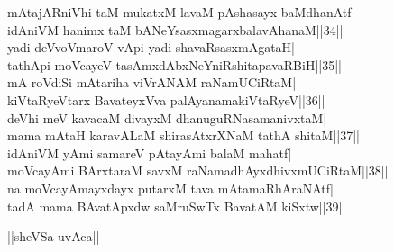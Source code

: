 \documentclass{article}
\begin{document}
mAtajARniVhi taM mukatxM lavaM pAshasayx baMdhanAtf|\\
idAniVM hanimx taM bANeYsasxmagarxbalavAhanaM||34||\\
yadi deVvoVmaroV vApi yadi shavaRsasxmAgataH|\\
tathApi moVcayeV tasAmxdAbxNeYniRshitapavaRBiH||35||\\
mA roVdiSi mAtariha viVrANAM raNamUCiRtaM|\\
kiVtaRyeVtarx BavateyxVva palAyanamakiVtaRyeV||36||\\
deVhi meV kavacaM divayxM dhanuguRNasamanivxtaM|\\
mama mAtaH karavALaM shirasAtxrXNaM tathA shitaM||37||\\
idAniVM yAmi samareV pAtayAmi balaM  mahatf|\\
moVcayAmi BArxtaraM savxM raNamadhAyxdhivxmUCiRtaM||38||\\
na moVcayAmayxdayx putarxM tava mAtamaRhAraNAtf|\\
tadA mama BAvatApxdw saMruSwTx BavatAM kiSxtw||39||\\

\begin{center}
||sheVSa uvAca||
\end{center}
\end{document}
